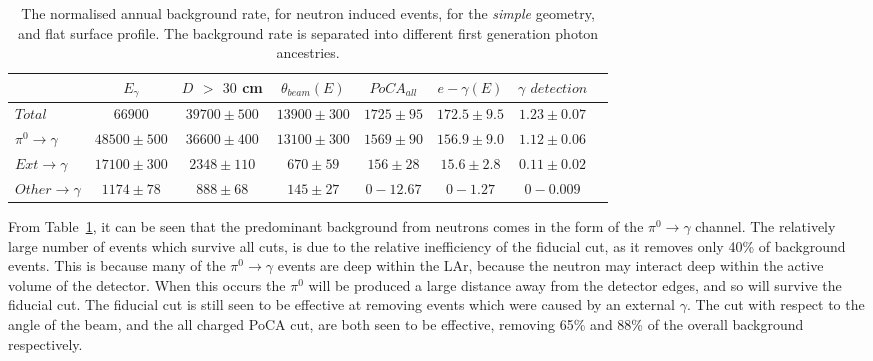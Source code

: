 \begin{table}
  \caption[The normalised annual background rate, for neutron induced events, for the \emph{simple} geometry, and flat surface profile]
          {The normalised annual background rate, for neutron induced events, for the \emph{simple} geometry, and flat surface profile. The background rate is separated into different first generation photon ancestries.}
  \label{tab:SurfNeuSimp}
  \centering
  \scriptsize
  \begin{tabular}{l c c c c c c c }
    \toprule
        & $E_\gamma$ &  $D$ $>$ $30$ cm & $\theta_{beam}(E)$ & $PoCA_{all}$ & $e-\gamma(E)$ & $\gamma$ $detection$ \\
        \midrule
        $Total$          & $66900$       & $39700\pm500$ & $13900\pm300$ & $1725\pm95$ & $172.5\pm9.5$ & $1.23\pm0.07$ \\

        $\pi^0\to\gamma$ & $48500\pm500$ & $36600\pm400$ & $13100\pm300$ & $1569\pm90$ & $156.9\pm9.0$ & $1.12\pm0.06$ \\

        $Ext\to\gamma$   & $17100\pm300$ & $2348\pm110$  & $670\pm59$    & $156\pm28$  & $15.6\pm2.8$  & $0.11\pm0.02$ \\

        $Other\to\gamma$ & $1174\pm78$   & $888\pm68$    & $145\pm27$    & $0-12.67$   & $0-1.27$      & $0-0.009$ \\
        \bottomrule
  \end{tabular}
\end{table}

From Table~\ref{tab:SurfNeuSimp}, it can be seen that the predominant background from neutrons comes in the form of the $\pi^0\to\gamma$ channel. The relatively large number of events which survive all cuts, is due to the relative inefficiency of the fiducial cut, as it removes only 40\% of background events. This is because many of the $\pi^0\to\gamma$ events are deep within the LAr, because the neutron may interact deep within the active volume of the detector. When this occurs the $\pi^0$ will be produced a large distance away from the detector edges, and so will survive the fiducial cut. The fiducial cut is still seen to be effective at removing events which were caused by an external $\gamma$. The cut with respect to the angle of the beam, and the all charged PoCA cut, are both seen to be effective, removing 65\% and 88\% of the overall background respectively. \\


